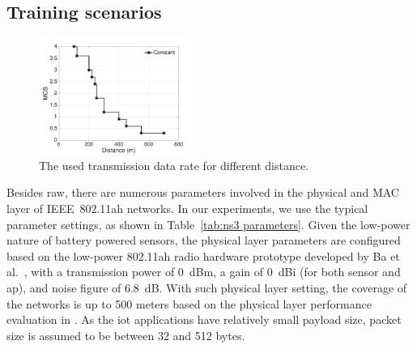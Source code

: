 \subsection{Training scenarios \label{subsec:training scenarios}}


\begin{figure}[t]
  \centering
  \includegraphics[width=0.45\textwidth]{figures/distance-datarate}  \caption{The used transmission data rate for different distance. \label{fig:dist-datarate}}
\end{figure}

Besides \gls{raw}, there are numerous parameters involved in the physical and MAC layer of IEEE~802.11ah networks.
In our experiments, we use the typical parameter settings, 
as shown in Table~\ref{tab:ns3 parameters}. Given the low-power nature of battery powered sensors, the physical layer parameters are configured based on the low-power 802.11ah radio hardware prototype developed by Ba et al.~\cite{Ba2016}, with a transmission power of 0~dBm, a gain of 0~dBi (for both sensor and \gls{ap}), and noise figure of 6.8~dB. With such physical layer setting, the coverage of the networks is up to 500 meters based on the physical layer performance evaluation in \cite{bellekens2017outdoor}. As the \gls{iot} applications have relatively small payload size, packet size is assumed to be between 32 and 512 bytes.


